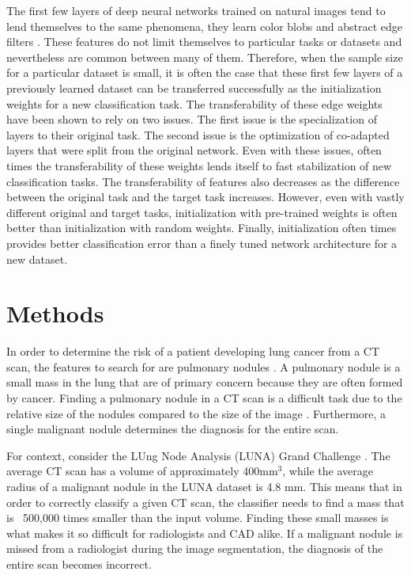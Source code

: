 \documentclass[conference,11pt]{IEEEtran}
\begin{document}
The first few layers of deep neural networks trained on natural images tend to lend themselves to the same phenomena, they learn color blobs and abstract edge filters \cite{yosinski_how_2014}. These features do not limit themselves to particular tasks or datasets and nevertheless are common between many of them. Therefore, when the sample size for a particular dataset is small, it is often the case that these first few layers of a previously learned dataset can be transferred successfully as the initialization weights for a new classification task. The transferability of these edge weights have been shown to rely on two issues. The first issue is the specialization of layers to their original task. The second issue is the optimization of co-adapted layers that were split from the original network. Even with these issues, often times the transferability of these weights lends itself to fast stabilization of new classification tasks. The transferability of features also decreases as the difference between the original task and the target task increases. However, even with vastly different original and target tasks, initialization with pre-trained weights is often better than initialization with random weights. Finally, initialization often times provides better classification error than a finely tuned network architecture for a new dataset.

\section{Methods}

In order to determine the risk of a patient developing lung cancer from a CT scan, the features to search for are pulmonary nodules \cite{armato_lung_2011}. A pulmonary nodule is a small mass in the lung that are of primary concern because they are often formed by cancer. Finding a pulmonary nodule in a CT scan is a difficult task due to the relative size of the nodules compared to the size of the image \cite{vansteenkiste_predicting_nodate}. Furthermore, a single malignant nodule determines the diagnosis for the entire scan.

For context, consider the  LUng Node Analysis (LUNA) Grand Challenge \cite{setio_validation_2016}. The average CT scan has a volume of approximately 400mm$^3$, while the average radius of a malignant nodule in the LUNA dataset is 4.8 mm. This means that in order to correctly classify a given CT scan, the classifier needs to find a mass that is ~500,000 times smaller than the input volume. Finding these small masses is what makes it so difficult for radiologists and CAD alike. If a malignant nodule is missed from a radiologist during the image segmentation, the diagnosis of the entire scan becomes incorrect.
\end{document}

